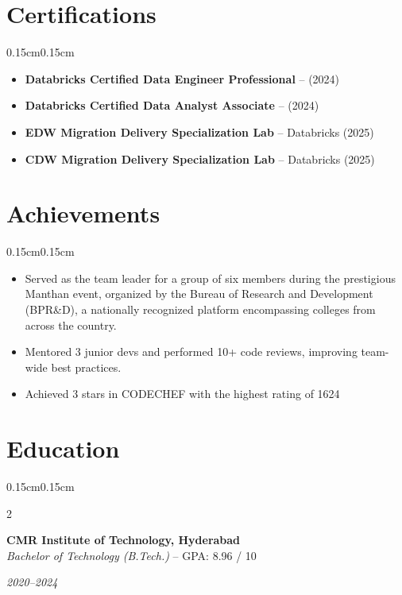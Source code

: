 \documentclass[10pt, letterpaper]{article}
\newenvironment{onecolentry}{
\begin{adjustwidth}{0.15cm}{0.15cm}
}{
\end{adjustwidth}
}
\newenvironment{twocolentry}[2][]{
\onecolentry
\def\secondColumn{#2}
\setcolumnwidth{\fill,4.2cm}
\begin{paracol}{2}
}{
\switchcolumn \raggedleft \secondColumn
\end{paracol}
\endonecolentry
}
\begin{document}
\section{Certifications}
\begin{onecolentry}
\begin{itemize}[leftmargin=*]
    \item \textbf{Databricks Certified Data Engineer Professional} -- (2024)
    \item \textbf{Databricks Certified Data Analyst Associate} -- (2024)
    \item \textbf{EDW Migration Delivery Specialization Lab} -- Databricks (2025)
    \item \textbf{CDW Migration Delivery Specialization Lab} -- Databricks (2025)
\end{itemize}
\end{onecolentry}

\section{Achievements}
\begin{onecolentry}
\begin{itemize}[leftmargin=*]
    \item Served as the team leader for a group of six members during the prestigious Manthan event, organized by the Bureau of Research and Development (BPR\&D), a nationally recognized platform encompassing colleges from across the country.
    \item Mentored 3 junior devs and performed 10+ code reviews, improving team-wide best practices.
    \item Achieved 3 stars in CODECHEF with the highest rating of 1624
\end{itemize}
\end{onecolentry}

\section{Education}
\begin{twocolentry}{\textit{2020--2024}}
\textbf{CMR Institute of Technology, Hyderabad} \\
    \textit{Bachelor of Technology (B.Tech.)} -- GPA: 8.96 / 10
\end{twocolentry}
\end{document}

